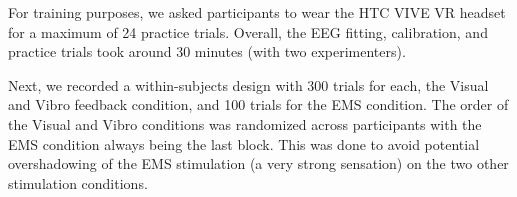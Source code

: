 
For training purposes, we asked participants to wear the HTC VIVE VR headset for a maximum of 24 practice trials. Overall, the EEG fitting, calibration, and practice trials took around 30 minutes (with two experimenters).

Next, we recorded a within-subjects design with 300 trials for each, the Visual and Vibro feedback condition, and 100 trials for the EMS condition. The order of the Visual and Vibro conditions was randomized across participants with the EMS condition always being the last block. This was done to avoid potential overshadowing of the EMS stimulation (a very strong sensation) on the two other stimulation conditions.






